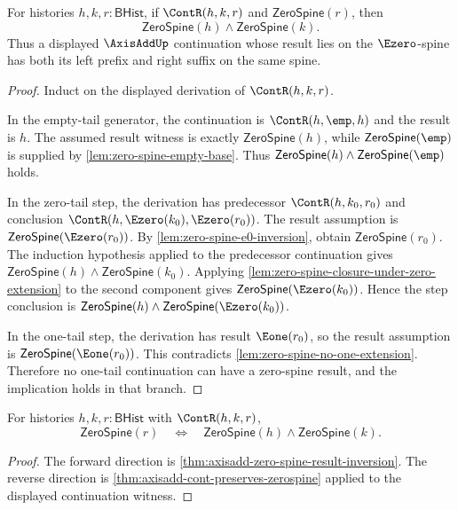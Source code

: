 \begin{theorem}
\label{thm:axisadd-zero-spine-result-inversion}
For histories $h,k,r:\mathsf{BHist}$, if $\ContR(h,k,r)$ and $\mathsf{ZeroSpine}(r)$, then
$$
\mathsf{ZeroSpine}(h)\wedge\mathsf{ZeroSpine}(k).
$$
Thus a displayed $\AxisAddUp$ continuation whose result lies on the $\Ezero$-spine has both its left prefix and right suffix on the same spine.
\end{theorem}
\begin{proof}
Induct on the displayed derivation of $\ContR(h,k,r)$.

In the empty-tail generator, the continuation is $\ContR(h,\emp,h)$ and the result is $h$. The assumed result witness is exactly $\mathsf{ZeroSpine}(h)$, while $\mathsf{ZeroSpine}(\emp)$ is supplied by \autoref{lem:zero-spine-empty-base}. Thus $\mathsf{ZeroSpine}(h)\wedge\mathsf{ZeroSpine}(\emp)$ holds.

In the zero-tail step, the derivation has predecessor $\ContR(h,k_0,r_0)$ and conclusion $\ContR(h,\Ezero(k_0),\Ezero(r_0))$. The result assumption is $\mathsf{ZeroSpine}(\Ezero(r_0))$. By \autoref{lem:zero-spine-e0-inversion}, obtain $\mathsf{ZeroSpine}(r_0)$. The induction hypothesis applied to the predecessor continuation gives $\mathsf{ZeroSpine}(h)\wedge\mathsf{ZeroSpine}(k_0)$. Applying \autoref{lem:zero-spine-closure-under-zero-extension} to the second component gives $\mathsf{ZeroSpine}(\Ezero(k_0))$. Hence the step conclusion is $\mathsf{ZeroSpine}(h)\wedge\mathsf{ZeroSpine}(\Ezero(k_0))$.

In the one-tail step, the derivation has result $\Eone(r_0)$, so the result assumption is $\mathsf{ZeroSpine}(\Eone(r_0))$. This contradicts \autoref{lem:zero-spine-no-one-extension}. Therefore no one-tail continuation can have a zero-spine result, and the implication holds in that branch.
\end{proof}

\begin{corollary}
\label{cor:axisadd-zero-spine-source-result-equivalence}
For histories $h,k,r:\mathsf{BHist}$ with $\ContR(h,k,r)$,
$$
\mathsf{ZeroSpine}(r)
\quad\Longleftrightarrow\quad
\mathsf{ZeroSpine}(h)\wedge\mathsf{ZeroSpine}(k).
$$
\end{corollary}
\begin{proof}
The forward direction is \autoref{thm:axisadd-zero-spine-result-inversion}. The reverse direction is \autoref{thm:axisadd-cont-preserves-zerospine} applied to the displayed continuation witness.
\end{proof}

